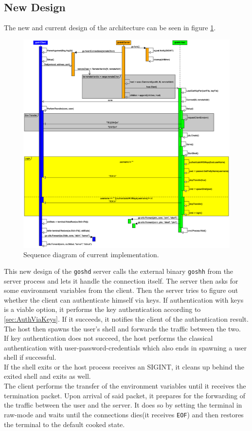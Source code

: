 \documentclass[10pt,a4paper,titlepage,twoside,english,final]{zhawreprt}
\begin{document}
\subsection{New Design}\label{ssec:NewDesign}
The new and current design of the architecture can be seen in figure \ref{fig:SeqDiaCurrent}.
\begin{figure}[ht]
\includegraphics[width=\textwidth]{SequenceDiagramNew}
\caption{Sequence diagram of current implementation.}
\label{fig:SeqDiaCurrent}
\end{figure}

This new design of the \texttt{goshd} server calls the external binary \texttt{goshh} from the server process and lets it handle the connection itself. The server then asks for some environment variables from the client. Then the server tries to figure out whether the client can authenticate himself via keys. If authentication with keys is a viable option, it performs the key authentication according to \ref{sec:AuthViaKeys}. If it succeeds, it notifies the client of the authentication result. The host then spawns the user's \gls{shell} and forwards the traffic between the two.\\
If key authentication does not succeed, the host performs the classical authentication with user-password-credentials which also ends in spawning a user \gls{shell} if successful.\\
If the \gls{shell} exits or the host process receives an \gls{SIGINT}, it cleans up behind the exited \gls{shell} and exits as well.\\
The client performs the transfer of the environment variables until it receives the termination packet. Upon arrival of said packet, it prepares for the forwarding of the traffic between the user and the server. It does so by setting the \gls{terminal} in raw-mode and waits until the connections dies(it receives \texttt{EOF}) and then restores the \gls{terminal} to the default cooked state.
\end{document}
